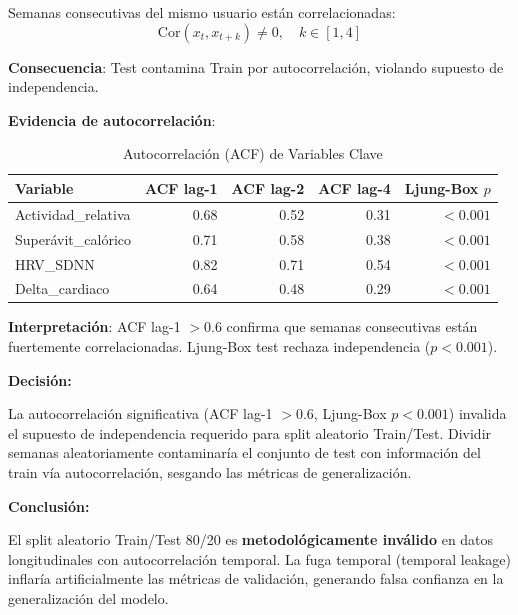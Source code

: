 \documentclass[12pt,letterpaper,twoside]{report}
\begin{document}
\begin{calculobox}
\begin{reglabox}
Semanas consecutivas del mismo usuario están correlacionadas:
\begin{equation}
\text{Cor}(x_t, x_{t+k}) \neq 0, \quad k \in [1, 4]
\end{equation}

\textbf{Consecuencia}: Test contamina Train por autocorrelación, violando supuesto de independencia.
\end{reglabox}

\begin{calculobox}
\textbf{Evidencia de autocorrelación}:

\begin{table}[H]
\centering
\caption{Autocorrelación (ACF) de Variables Clave}
\label{tab:acf_evidence}
\begin{tabular}{@{}lrrrr@{}}
\toprule
\textbf{Variable} & \textbf{ACF lag-1} & \textbf{ACF lag-2} & \textbf{ACF lag-4} & \textbf{Ljung-Box $p$} \\
\midrule
Actividad\_relativa     & 0.68 & 0.52 & 0.31 & $< 0.001$ \\
Superávit\_calórico     & 0.71 & 0.58 & 0.38 & $< 0.001$ \\
HRV\_SDNN               & 0.82 & 0.71 & 0.54 & $< 0.001$ \\
Delta\_cardiaco         & 0.64 & 0.48 & 0.29 & $< 0.001$ \\
\bottomrule
\end{tabular}
\end{table}

\textbf{Interpretación}: ACF lag-1 $> 0.6$ confirma que semanas consecutivas están fuertemente correlacionadas. Ljung-Box test rechaza independencia ($p<0.001$).
\end{calculobox}

\begin{decisionbox}
\textbf{Decisión:}

La autocorrelación significativa (ACF lag-1 $> 0.6$, Ljung-Box $p < 0.001$) invalida el supuesto de independencia requerido para split aleatorio Train/Test. Dividir semanas aleatoriamente contaminaría el conjunto de test con información del train vía autocorrelación, sesgando las métricas de generalización.
\end{decisionbox}

\begin{conclusionbox}
\textbf{Conclusión:}

El split aleatorio Train/Test 80/20 es \textbf{metodológicamente inválido} en datos longitudinales con autocorrelación temporal. La fuga temporal (temporal leakage) inflaría artificialmente las métricas de validación, generando falsa confianza en la generalización del modelo.
\end{conclusionbox}


\end{calculobox}
\end{document}
